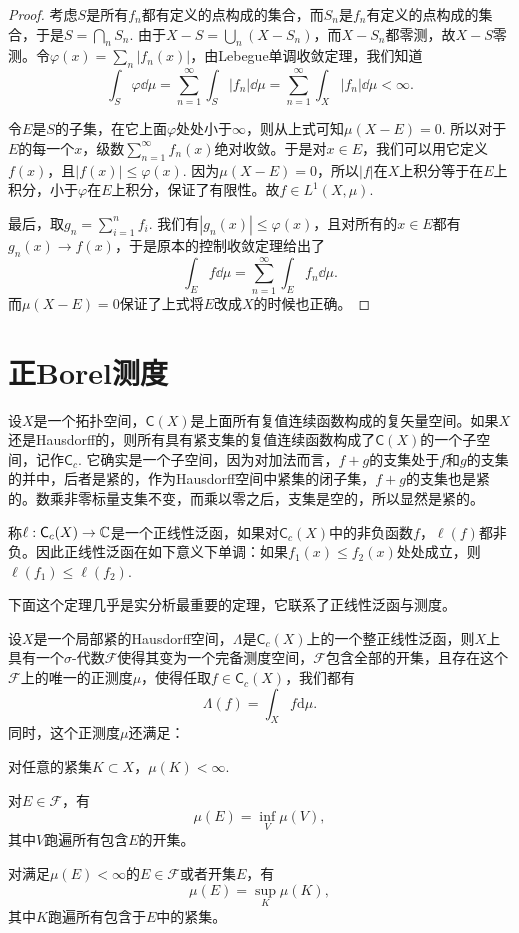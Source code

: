 \begin{proof}
考虑$S$是所有$f_n$都有定义的点构成的集合，而$S_n$是$f_n$有定义的点构成的集合，于是$S=\bigcap_n S_n$. 由于$X-S=\bigcup_n (X-S_n)$，而$X-S_n$都零测，故$X-S$零测。令$\varphi(x)=\sum_n |f_n(x)|$，由Lebegue单调收敛定理，我们知道
\[
	\int_S \varphi \dd \mu=\sum_{n=1}^\infty\int_S |f_n|\dd \mu=\sum_{n=1}^\infty\int_X |f_n|\dd \mu<\infty.
\]

令$E$是$S$的子集，在它上面$\varphi$处处小于$\infty$，则从上式可知$\mu(X-E)=0$. 所以对于$E$的每一个$x$，级数$\sum_{n=1}^\infty f_n(x)$绝对收敛。于是对$x\in E$，我们可以用它定义$f(x)$，且$|f(x)|\leq \varphi(x)$. 因为$\mu(X-E)=0$，所以$|f|$在$X$上积分等于在$E$上积分，小于$\varphi$在$E$上积分，保证了有限性。故$f\in L^1(X,\mu)$.

最后，取$g_n=\sum_{i=1}^n f_i$. 我们有$|g_n(x)|\leq \varphi(x)$，且对所有的$x\in E$都有$g_n(x)\to f(x)$，于是原本的控制收敛定理给出了
\[
	\int_E f\dd \mu=\sum_{n=1}^\infty\int_E f_n\dd \mu.
\]
而$\mu(X-E)=0$保证了上式将$E$改成$X$的时候也正确。
\end{proof}

\section{正Borel测度}

\begin{para}
设$X$是一个拓扑空间，$\mathsf{C}(X)$是上面所有复值连续函数构成的复矢量空间。如果$X$还是Hausdorff的，则所有具有紧支集的复值连续函数构成了$\mathsf{C}(X)$的一个子空间，记作$\mathsf{C}_c$. 它确实是一个子空间，因为对加法而言，$f+g$的支集处于$f$和$g$的支集的并中，后者是紧的，作为Hausdorff空间中紧集的闭子集，$f+g$的支集也是紧的。数乘非零标量支集不变，而乘以零之后，支集是空的，所以显然是紧的。

称$\ell:\mathsf{C}_c(X)\to \mathbb{C}$是一个正线性泛函，如果对$\mathsf{C}_c(X)$中的非负函数$f$，$\ell(f)$都非负。因此正线性泛函在如下意义下单调：如果$f_1(x)\leq f_2(x)$处处成立，则$\ell(f_1)\leq \ell(f_2)$.
\end{para}

下面这个定理几乎是实分析最重要的定理，它联系了正线性泛函与测度。

\begin{thm}[Riesz表示定理]
	设$X$是一个局部紧的Hausdorff空间，$\Lambda$是$\mathsf{C}_c(X)$上的一个整正线性泛函，则$X$上具有一个$\sigma$-代数$\mathscr{F}$使得其变为一个完备测度空间，$\mathscr{F}$包含全部的开集，且存在这个$\mathscr{F}$上的唯一的正测度$\mu$，使得任取$f\in \mathsf{C}_c(X)$，我们都有
	\[
	\Lambda(f)=\int_X f\mathrm{d}\mu.
	\]
	同时，这个正测度$\mu$还满足：
	\begin{compactenum}[~~~(1)]
	\item 对任意的紧集$K\subset X$，$\mu(K)<\infty$.
	\item 对$E\in \mathscr{F}$，有
	\[
	\mu(E)=\inf_V \mu(V),
	\]
	其中$V$跑遍所有包含$E$的开集。
	\item 对满足$\mu(E)<\infty$的$E\in \mathscr{F}$或者开集$E$，有
	\[
	\mu(E)=\sup_K \mu(K),
	\]
	其中$K$跑遍所有包含于$E$中的紧集。
	\end{compactenum}
\end{thm}

